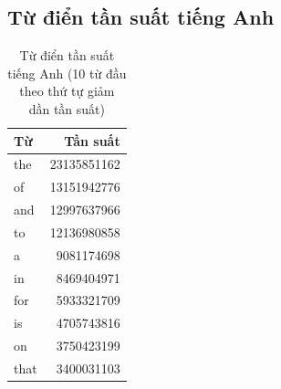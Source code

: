 \subsection*{Từ điển tần suất tiếng Anh}
\begin{table}[htb]
\centering
\caption{Từ điển tần suất tiếng Anh (10 từ đầu theo thứ tự giảm dần tần suất)}
\begin{tabular}{l r}
    \toprule
    \textbf{Từ} & \textbf{Tần suất} \\\midrule
    the         & 23135851162       \\
    of          & 13151942776       \\
    and         & 12997637966       \\
    to          & 12136980858       \\
    a           & 9081174698        \\
    in          & 8469404971        \\
    for         & 5933321709        \\
    is          & 4705743816        \\
    on          & 3750423199        \\
    that        & 3400031103        \\
    \bottomrule
\end{tabular}
\end{table}

\newpage
